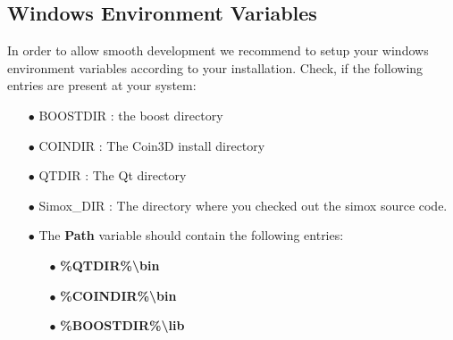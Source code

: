 \documentclass{book}
\begin{document}
\subsection{Windows Environment Variables}
In order to allow smooth development we recommend to setup your windows environment variables according to your installation. Check, if the following entries are present at your system: 
\begin{itemize}

\item[$\bullet$]BOOSTDIR : the boost directory  
\item[$\bullet$]COINDIR : The Coin3D install directory   
\item[$\bullet$]QTDIR : The Qt directory 
\item[$\bullet$]Simox\_DIR : The directory where you checked out the simox source code.  
\item[$\bullet$]The \textbf{Path} variable should contain the following entries:  
\begin{itemize}
\item[$\bullet$]\textbf{\%QTDIR\%\textbackslash bin}
\item[$\bullet$]\textbf{\%COINDIR\%\textbackslash bin}  
\item[$\bullet$]\textbf{\%BOOSTDIR\%\textbackslash lib}
\end{itemize}
\end{itemize}
\end{document}
